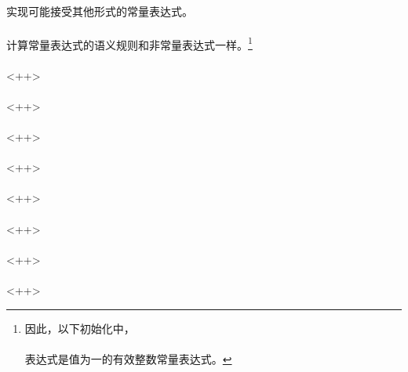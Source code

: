 \paragraph{}
实现可能接受其他形式的常量表达式。

\paragraph{}
计算常量表达式的语义规则和非常量表达式一样。\footnote{因此，以下初始化中，    \\
\mbox{\hspace{4em}}                            \\
表达式是值为一的有效整数常量表达式。}


\syntax
\paragraph{}<++>

\constraint
\paragraph{}<++>

\paragraph{}<++>

\paragraph{}<++>

\semantic
\paragraph{}<++>

\paragraph{}<++>

\paragraph{}<++>

\fwdref{<++>}

\syntax
\paragraph{}<++>

